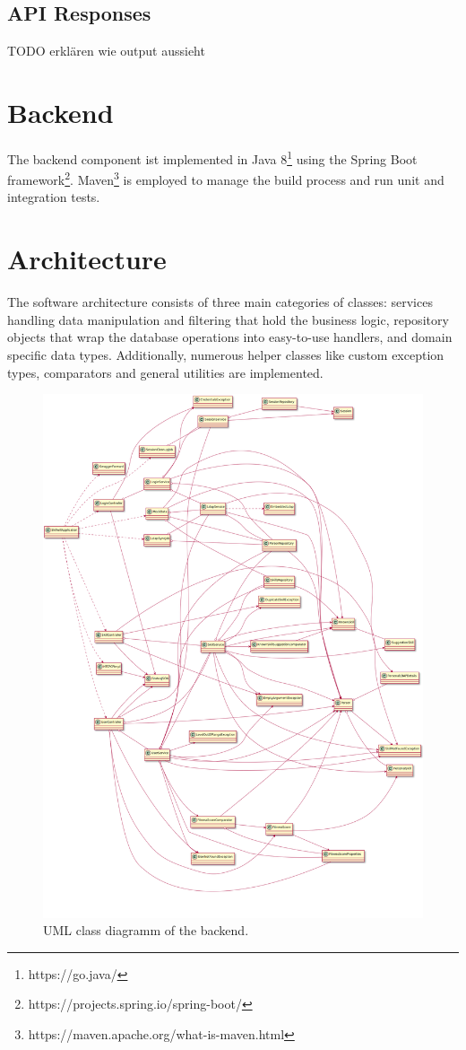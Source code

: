 \subsection{API Responses}
TODO erklären wie output aussieht


\section{Backend}
The backend component ist implemented in Java 8\footnote{https://go.java/} using the Spring Boot framework\footnote{https://projects.spring.io/spring-boot/}. Maven\footnote{https://maven.apache.org/what-is-maven.html} is employed to manage the build process and run unit and integration tests.

\section{Architecture}
The software architecture consists of three main categories of classes: services handling data manipulation and filtering that hold the business logic, repository objects that wrap the database operations into easy-to-use handlers, and domain specific data types. Additionally, numerous helper classes like custom exception types, comparators and general utilities are implemented.
\begin{figure}[!htp]
    \centering
    \includegraphics[width=\textwidth]{images/uml.png}
    \caption[Backend Class Diagramm]{UML class diagramm of the backend.}
    \label{fig:markovchain}
\end{figure}

